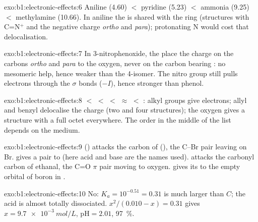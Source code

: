 \begin{solution}{exo:b1:electronic-effects:6}
Aniline (4.60) $<$ pyridine (5.23) $<$ ammonia (9.25) $<$ methylamine
(10.66). In aniline the  is shared with the ring
(structures with C=N$^+$ and the negative charge \textit{ortho} and
\textit{para}); protonating N would cost that delocalisation.
\end{solution}

\begin{solution}{exo:b1:electronic-effects:7}
In 3-nitrophenoxide, the  place the charge on the
carbons \textit{ortho} and \textit{para} to the oxygen, never on the carbon
bearing : no mesomeric help, hence weaker than the 4-isomer. The
nitro group still pulls electrons through the $\sigma$ bonds ($-I$),
hence stronger than phenol.
\end{solution}

\begin{solution}{exo:b1:electronic-effects:8}
 $<$  $<$  $<$ 
$\approx$  $<$ : alkyl groups give electrons;
allyl and benzyl delocalise the charge (two and four structures); the
oxygen  gives a structure with a full octet everywhere. The order
in the middle of the list depends on the medium.
\end{solution}

\begin{solution}{exo:b1:electronic-effects:9}
 () attacks the carbon of  (),
the C--Br pair leaving on Br.  gives a pair to  (here acid
and base are the names used).  attacks the carbonyl carbon of
ethanal, the C=O $\pi$ pair moving to oxygen.  gives its 
to the empty orbital of boron in .
\end{solution}

\begin{solution}{exo:b1:electronic-effects:10}
No: $K_a = 10^{-0.51} = 0.31$ is much larger than $C$; the acid is almost
totally dissociated. $x^2/(0.010 - x) = 0.31$ gives $x = \qty{9.7e-3}{mol/L}$,
$\mathrm{pH} = 2.01$,  \qty{97}{\percent}.
\end{solution}

